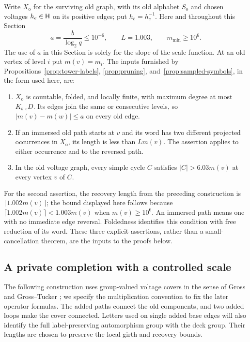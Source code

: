 Write $X_{\mathrm o}$ for the surviving old graph, with its old alphabet
$S_{\mathrm o}$ and chosen voltages $h_e\in\mathsf H$ on its positive edges;
put $h_{\bar e}=h_e^{-1}$.  Here and throughout this Section
\[
 a=\frac b{\log_2 q}\le 10^{-6},\qquad
 L=1.003,\qquad m_{\min}\ge10^6.
\]
The use of $a$ in this Section is solely for the slope of the scale function.
At an old vertex of level $i$ put $m(v)=m_i$.
The inputs furnished by Propositions~\ref{prop:tower-labels},
\ref{prop:pruning}, and~\ref{prop:sampled-symbols}, in the form used here, are:
\begin{enumerate}
\item $X_{\mathrm o}$ is countable, folded, and locally finite, with maximum
 degree at most $K_{b,\epsilon}D$.  Its edges join the same or consecutive
 levels, so $|m(v)-m(w)|\le a$ on every old edge.
\item If an immersed old path starts at $v$ and its word has two different
 projected occurrences in $X_{\mathrm o}$, its length is less than $Lm(v)$.
 The assertion applies to either occurrence and to the reversed path.
\item In the old voltage graph, every simple cycle $C$ satisfies
 $|C|>6.03m(v)$ at every vertex $v$ of $C$.
\end{enumerate}
For the second assertion, the recovery length from the preceding construction
is $\lceil1.002m(v)\rceil$; the bound displayed here follows because
$\lceil1.002m(v)\rceil<1.003m(v)$ when $m(v)\ge10^6$.
An immersed path means one with no immediate edge reversal.  Foldedness
identifies this condition with free reduction of its word.
These three explicit assertions, rather than a small-cancellation theorem,
are the inputs to the proofs below.

\subsection{A private completion with a controlled scale}

The following construction uses group-valued voltage covers in the sense
of Gross and Gross--Tucker \cite{Gross74,GT77}; we specify the multiplication
convention to fix the later operator formulas.
The added paths connect the old components, and two added loops make the
cover connected.  Letters used on single added base edges will also identify the full
label-preserving automorphism group with the deck group.  Their lengths
are chosen to preserve the local girth and recovery bounds.

